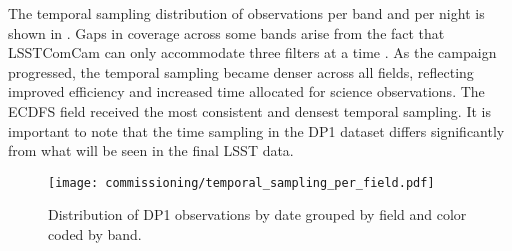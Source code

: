 The temporal sampling distribution of observations per band and per night is shown in . 
Gaps in coverage across some bands arise from the fact that LSSTComCam can only accommodate three filters at a time . 
As the campaign progressed, the temporal sampling became denser across all fields, reflecting improved efficiency and increased time allocated for science observations. 
The ECDFS field received the most consistent and densest temporal sampling. 
It is important to note that the time sampling in the DP1 dataset differs significantly from what will be seen in the final LSST data.
\begin{figure*}[htb!]
\centering
\texttt{[image: commissioning/temporal\_sampling\_per\_field.pdf]}
\caption{Distribution of DP1 observations by date grouped by field and color coded by band.}
\label{fig:target_fields_temporal_sampling}
\vspace{0.1cm}
\end{figure*}

